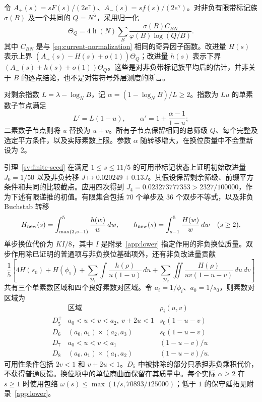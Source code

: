 令 $A_+(s)=sF(s)/(2e^\gamma)$、$A_-(s)=sf(s)/(2e^\gamma)$。对非负有限带标记族 $\sigma(B)$ 及一个共同的 $Q=N^\lambda$，采用归一化
\[
 \Theta_Q=4\operatorname{li}(N)
       \sum_B\frac{\sigma(B)C_{BN}}{\varphi(B)\log(Q/B)}.
\]
其中 $C_{BN}$ 是与 \eqref{eq:current-normalization} 相同的奇异因子函数。改进量 $H(s)$ 表示上界 $(A_+(s)-H(s)+o(1))\Theta_Q$；改进量 $h(s)$ 表示下界 $(A_-(s)+h(s)+o(1))\Theta_Q$。这些是对非负带标记族平均后的估计，并非关于 $B$ 的逐点结论，也不是对带符号外层测度的断言。

对剩余指数 $L=\lambda-\log_NB$，记 $\alpha=(1-\log_NB)/L\ge2$。指数为 $Lu$ 的单素数子节点满足
\[
 L'=L(1-u),\qquad \alpha'=1+\frac{\alpha-1}{1-u};
\]
二素数子节点则将 $u$ 替换为 $u+v$。所有子节点保留相同的总筛级 $Q$、每个完整及选定平方条件，以及实际素数上限。参数 $\alpha$ 随转移增大，在换位质量中不会重新设为 $2$。

引理~\ref{sv:finite-seed} 在满足 $1\le s\le11/5$ 的可用带标记状态上证明初始改进量 $J_0=1/50$ 以及非负转移 $J\mapsto0.020249+0.13J$。其假设保留剩余筛级、前缀平方条件和共同的比较截点。应用四次得到 $J_4=0.023273777353>2327/100000$，作为下述有限递推的初值。有限集合包括 $70$ 个单步及 $36$ 个双步不等式，以及非负 Buchstab 转移
\[
 H_{\rm new}(s)=\int_{\max(2,s-1)}^5\frac{h(w)}w\,dw,
 \qquad
 h_{\rm new}(s)=\int_{s-1}^5\frac{H(w)}w\,dw\quad(s\ge2).
\]
单步换位代价为 $KI/8$，其中 $I$ 是附录~\ref{app:lower} 指定作用的非负换位质量。双步作用除已证明的普通项与非负换位基础项外，还有非负改进量贡献
\begin{equation}
 \frac15\left[4H(s_0)+H(\phi_1)
  +\sum_{\mathcal D_1}\int\frac{h(\rho)}{u(1-u)}\,du
  +\sum_{\mathcal D_2}\iint\frac{H(\rho)}{uv(1-u-v)}\,du\,dv\right]
 \label{eq:current-w2-feedback}
\end{equation}
共有三个单素数区域和四个良好素数对区域。令 $a_i=1/\phi_i$、$a_0=1/s_0$，则素数对区域为
\[
 \begin{array}{c|c|c}
 &\text{区域}&\rho_i(u,v)\\ \hline
 D_5^+&a_0<u<v<a_2,\ v+2u<1&s_0(1-u-v)\\
 D_6&(a_0,a_1)\mathbin{\times}(a_2,a_3)&s_0(1-u-v)\\
 D_7&a_0<u<v<a_1&(1-u-v)/u\\
 D_8&(a_0,a_1)\mathbin{\times}(a_1,a_2)&(1-u-v)/u.
 \end{array}
\]
可用性条件包括 $2v<1$ 和 $v+2u<1$。$D_5$ 中被排除的部分只承担非负乘积代价，不获得普通反馈。换位项中的单位商曲面保留在其质量中。每个实际 $\alpha\ge2$ 在 $s\ge1$ 时使用包络 $\omega(s)\le\max(1/s,70893/125000)$；低于 $1$ 的保守延拓见附录~\ref{app:lower}。

